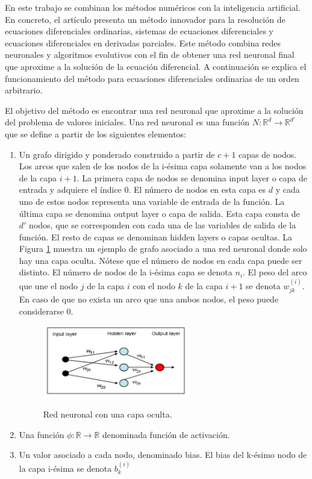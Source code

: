 \documentclass{article}
\theoremstyle{theorem-style}  %
\theoremstyle{definition-style}
\theoremstyle{example-style}
\begin{document}
	En este trabajo se combinan los métodos numéricos con la inteligencia artificial. En concreto, el artículo presenta un método innovador para la resolución de ecuaciones diferenciales ordinarias, sistemas de ecuaciones diferenciales y ecuaciones diferenciales en derivadas parciales. Este método combina redes neuronales y algoritmos evolutivos con el fin de obtener una red neuronal final que aproxime a la solución de la ecuación diferencial. A continuación se explica el funcionamiento del método para ecuaciones diferenciales ordinarias de un orden arbitrario. 
		
	El objetivo del método es encontrar una red neuronal que aproxime a la solución del problema de valores iniciales. Una red neuronal es una función $N: \mathbb{R}^d \rightarrow \mathbb{R}^{d'}$ que se define a partir de los siguientes elementos:
	
	\begin{enumerate}
		\item Un grafo dirigido y ponderado construido a partir de $c+1$ capas de nodos. Los arcos que salen de los nodos de la i-ésima capa solamente van a los nodos de la capa $i+1$. La primera capa de nodos se denomina input layer o capa de entrada y adquiere el índice $0$. El número de nodos en esta capa es $d$ y cada uno de estos nodos representa una variable de entrada de la función. La última capa se denomina output layer o capa de salida. Esta capa consta de $d'$ nodos, que se corresponden con cada una de las variables de salida de la función. El resto de capas se denominan hidden layers o capas ocultas. La Figura \ref{fig:nn} muestra un ejemplo de grafo asociado a una red neuronal donde solo hay una capa oculta. Nótese que el número de nodos en cada capa puede ser distinto. El número de nodos de la i-ésima capa se denota $n_i$. El peso del arco que une el nodo $j$ de la capa $i$ con el nodo $k$ de la capa $i+1$ se denota $w_{jk}^{(i)}$. En caso de que no exista un arco que una ambos nodos, el peso puede considerarse $0$.
		
		\begin{figure}[H]
			\centering
			\includegraphics[width=0.6\textwidth]{./Images/nn.png}
			\label{fig:nn}
			\caption{Red neuronal con una capa oculta.}
		\end{figure}
		\item Una función $\phi: \mathbb{R} \rightarrow \mathbb{R}$ denominada función de activación.
		\item Un valor asociado a cada nodo, denominado bias. El bias del k-ésimo nodo de la capa i-ésima se denota $b_k^{(i)}$
	\end{enumerate}
\end{document}
